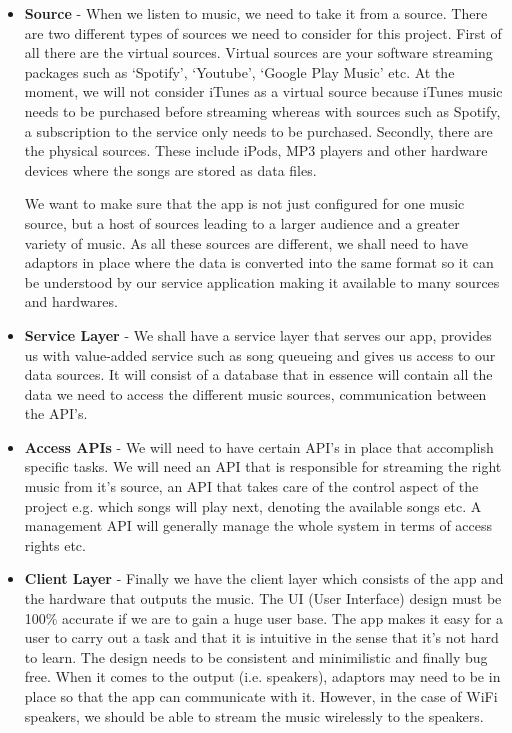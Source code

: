 \begin{itemize}
  \item \textbf{Source} - 
    When we listen to music, we need to take it from a source.  There are two different types of sources we need to consider for this project.  First of all there are the virtual sources.  Virtual sources are your software streaming packages such as `Spotify', `Youtube', `Google Play Music' etc.  At the moment, we will not consider iTunes as a virtual source because iTunes music needs to be purchased before streaming whereas with sources such as Spotify, a subscription to the service only needs to be purchased.  Secondly, there are the physical sources.  These include iPods, MP3 players and other hardware devices where the songs are stored as data files.  

    We want to make sure that the app is not just configured for one music source, but a host of sources leading to a larger audience and a greater variety of music.  As all these sources are different, we shall need to have adaptors in place where the data is converted into the same format so it can be understood by our service application making it available to many sources and hardwares.  
  \item \textbf{Service Layer} - 
    We shall have a service layer that serves our app, provides us with value-added service such as song queueing and gives us access to our data sources.   It will consist of a database that in essence will contain all the data we need to access the different music sources, communication between the API's.  
  \item \textbf{Access APIs} - 
    We will need to have certain API's in place that accomplish specific tasks.  We will need an API that is responsible for streaming the right music from it's source, an API that takes care of the control aspect of the project e.g. which songs will play next, denoting the available songs etc.  A management API will generally manage the whole system in terms of access rights etc. 
  \item \textbf{Client Layer} - 
    Finally we have the client layer which consists of the app and the hardware that outputs the music.  The UI (User Interface) design must be 100\% accurate if we are to gain a huge user base.  The app makes it easy for a user to carry out a task and that it is intuitive in the sense that it's not hard to learn.  The design needs to be consistent and minimilistic and finally bug free.
    When it comes to the output (i.e. speakers), adaptors may need to be in place so that the app can communicate with it.  However, in the case of WiFi speakers, we should be able to stream the music wirelessly to the speakers.
\end{itemize}

